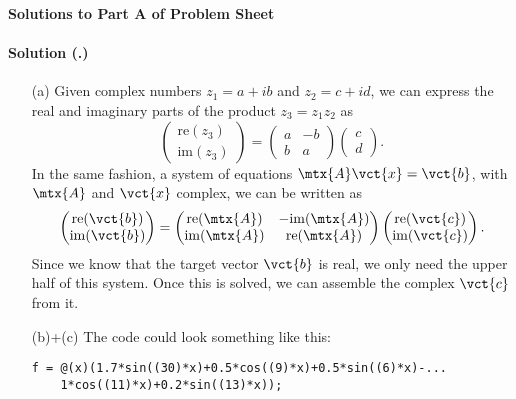 \documentclass{article}
\newcounter{problemSheetNumber}
\newcounter{problems}
\renewcommand{\solution}[1]{\paragraph{Solution (\theproblemSheetNumber.\theproblems)}\addtocounter{problems}{1}\label{#1}}
\begin{document}
 
\begin{center}
{\Large {\bf Solutions to Part A of Problem Sheet \theproblemSheetNumber}}
\end{center}

\solution{pr:1} 
\begin{itemize}
 \item[(a)] Given complex numbers $z_1=a+ib$ and $z_2=c+id$, we can express the real and imaginary parts of the product $z_3=z_1z_2$ as
 \begin{equation*}
  \begin{pmatrix}
   \mathrm{re}(z_3)\\
   \mathrm{im}(z_3)
  \end{pmatrix}=
  \begin{pmatrix}
   a & -b\\
   b & a
  \end{pmatrix}
\begin{pmatrix}
 c \\ d
\end{pmatrix}.
 \end{equation*}
In the same fashion, a system of equations $\mtx{A}\vct{x}=\vct{b}$, with $\mtx{A}$ and $\vct{x}$ complex, we can be written as
\begin{equation*}
 \begin{pmatrix}
  \mathrm{re}(\vct{b})\\
  \mathrm{im}(\vct{b})
 \end{pmatrix}=
 \begin{pmatrix}
  \mathrm{re}(\mtx{A}) & -\mathrm{im}(\mtx{A})\\
  \mathrm{im}(\mtx{A}) & \mathrm{re}(\mtx{A})
 \end{pmatrix}
 \begin{pmatrix}
  \mathrm{re}(\vct{c})\\
  \mathrm{im}(\vct{c})
 \end{pmatrix}.
\end{equation*}
Since we know that the target vector $\vct{b}$ is real, we only need the upper half of this system. Once this is solved, we can assemble the complex $\vct{c}$ from it.

\item[(b)+(c)] The code could look something like this:

{\small
\begin{lstlisting}[frame=single]
% Define signal on interval [0,2\pi]
f = @(x)(1.7*sin((30)*x)+0.5*cos((9)*x)+0.5*sin((6)*x)-...
    1*cos((11)*x)+0.2*sin((13)*x));


\end{lstlisting}}
\end{itemize}
\end{document}
